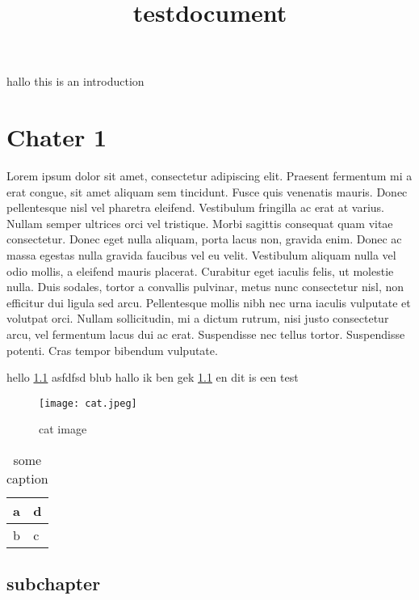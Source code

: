 \documentclass[a4paper, 12pt]{scrbook}
\title{testdocument}
\begin{document}
\maketitle


hallo this is an introduction


\chapter{Chater 1}

Lorem ipsum dolor sit amet, consectetur adipiscing elit. Praesent fermentum mi a erat congue, sit amet aliquam sem tincidunt. Fusce quis venenatis mauris. Donec pellentesque nisl vel pharetra eleifend. Vestibulum fringilla ac erat at varius. Nullam semper ultrices orci vel tristique. Morbi sagittis consequat quam vitae consectetur. Donec eget nulla aliquam, porta lacus non, gravida enim. Donec ac massa egestas nulla gravida faucibus vel eu velit. Vestibulum aliquam nulla vel odio mollis, a eleifend mauris placerat. Curabitur eget iaculis felis, ut molestie nulla. Duis sodales, tortor a convallis pulvinar, metus nunc consectetur nisl, non efficitur dui ligula sed arcu. Pellentesque mollis nibh nec urna iaculis vulputate et volutpat orci. Nullam sollicitudin, mi a dictum rutrum, nisi justo consectetur arcu, vel fermentum lacus dui ac erat. Suspendisse nec tellus tortor. Suspendisse potenti. Cras tempor bibendum vulputate.


hello \ref{cat} asfdfsd blub hallo ik ben gek  \ref{some table} en dit is een test

\begin{figure}
\texttt{[image: cat.jpeg]}
\caption{cat image}
\label{cat}
\end{figure}

\begin{table}
\begin{tabular}{ll}
a&d \\ \hline
b&c \\ \hline
\end{tabular}
\caption{some caption}
\label{some table}
\end{table}

\section{subchapter}
\end{document}

